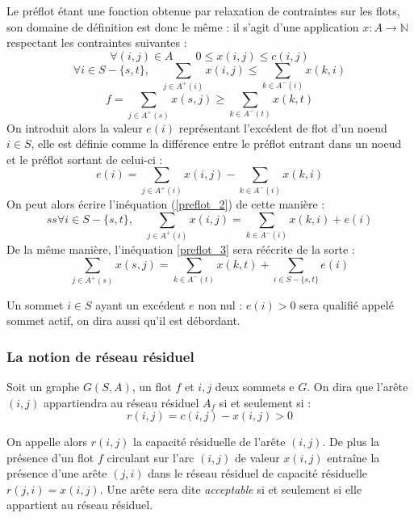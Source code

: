 Le préflot étant une fonction obtenue par relaxation de contraintes sur les flots, son
domaine de définition est donc le même : il s'agit d'une application $x : A \rightarrow \mathbb{N}$
respectant les contraintes suivantes :
		\begin{equation}
			\label{preflot_1}
			\forall (i,j) \in A \qquad 0 \leq x(i,j) \leq c(i,j)
		\end{equation}
		\begin{equation} 
			\label{preflot_2}
			\forall i \in S - \{s,t\},\quad \sum_{j \in A^+(i)} x(i,j) \leq \sum_{k \in A^-(i)} x(k,i)
		\end{equation}
		\begin{equation}
			\label{preflot_3}
			f = \sum_{j \in A^+(s)} x(s,j) \geq \sum_{k \in A^-(t)} x(k, t)
		\end{equation}
On introduit alors la valeur $e(i)$ représentant l'excédent de flot d'un noeud $i \in S$, elle est
définie comme la différence entre le préflot entrant dans un noeud et le préflot sortant de celui-ci
: \begin{equation}
	e(i) = \sum_{j \in A^+(i)} x(i,j) - \sum_{k \in A^-(i)} x(k,i)
\end{equation}
 On peut alors écrire l'inéquation (\ref{preflot_2}) de cette manière :
\begin{equation}ss
\forall i \in S - \{s,t\},\quad \sum_{j \in A^+(i)} x(i,j) = \sum_{k \in A^-(i)} x(k,i) + e(i)
\end{equation}
De la même manière, l'inéquation \ref{preflot_3} sera réécrite de la sorte :
\begin{equation}
\sum_{j \in A^+(s)} x(s,j) = \sum_{k \in A^-(t)} x(k, t) + \sum_{i \in S-\{s,t\}} e(i)
\end{equation}

Un sommet $i \in S$ ayant un excédent $e$ non nul : $e(i) > 0$ sera qualifié appelé sommet actif, on
dira aussi qu'il est débordant.

\subsubsection{La notion de réseau résiduel}

Soit un graphe $G(S, A)$, un flot $f$ et $i,j$ deux sommets e $G$. On dira que l'arête
$(i,j)$ appartiendra au réseau résiduel $A_f$ si et seulement si :
\begin{equation}
	 r(i,j) = c(i,j) - x(i,j) > 0
\end{equation}

On appelle alors $r(i,j)$ la capacité résiduelle de l'arête $(i,j)$. De plus la présence d'un flot
$f$ circulant sur l'arc $(i,j)$ de valeur $x(i,j)$ entraîne la présence d'une arête $(j,i)$
dans le réseau résiduel de capacité résiduelle $r(j,i) = x(i,j)$. Une arête sera dite
\emph{acceptable} si et seulement si elle appartient au réseau résiduel.

